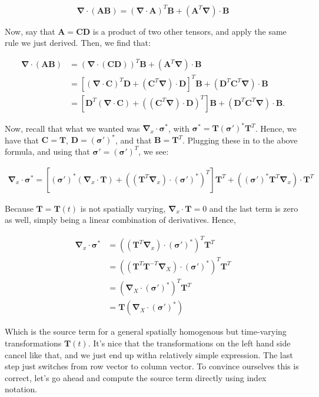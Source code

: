 \documentclass[11pt]{article}
\newcommand{\bsig}{\boldsymbol\sigma}
\newcommand{\bC}{\mathbf{C}}
\newcommand{\bD}{\mathbf{D}}
\newcommand{\bT}{\mathbf{T}}
\newcommand{\bgrad}{\boldsymbol{\nabla}}
\newcommand{\bA}{\mathbf{A}}
\newcommand{\bB}{\mathbf{B}}
\begin{document}
\begin{equation*}
    \bgrad\cdot(\bA \bB) = (\bgrad\cdot \bA)^T\bB + (\bA^T\bgrad)\cdot \bB
\end{equation*}

Now, say that $\bA = \bC \bD$ is a product of two other tensors, and apply the same rule we just derived. Then, we find that:

\begin{align*}
    \bgrad\cdot(\bA \bB) &= (\bgrad \cdot (\bC \bD))^T\bB + (\bA^T \bgrad)\cdot \bB\\
    &= [(\bgrad\cdot \bC)^T\bD + (\bC^T\bgrad)\cdot \bD]^T\bB + (\bD^T\bC^T\bgrad)\cdot\bB\\
    &= [\bD^T(\bgrad\cdot\bC) + ((\bC^T\bgrad)\cdot \bD)^T]\bB + (\bD^T\bC^T\bgrad)\cdot\bB.
\end{align*}

Now, recall that what we wanted was $\bgrad_x \cdot \bsig^*$, with $\bsig^* = \bT (\bsig')^* \bT^T$. Hence, we have that $\bC = \bT$, $\bD = (\bsig')^*$, and that $\bB = \bT^T$. Plugging these in to the above formula, and using that $\bsig' = (\bsig')^T$, we see:

\begin{align*}
    \bgrad_x\cdot\bsig^* = [( \bsig' )^*(\bgrad_x\cdot \bT) + ((\bT^T\bgrad_x)\cdot( \bsig' )^*)^T]\bT^T + (( \bsig' )^*\bT^T\bgrad_x)\cdot\bT^T
\end{align*}

Because $\bT = \bT(t)$ is not spatially varying, $\bgrad_x \cdot \bT = 0$ and the last term is zero as well, simply being a linear combination of derivatives. Hence,

\begin{align*}
    \bgrad_x\cdot\bsig^* &= ((\bT^T\bgrad_x)\cdot(\bsig')^*)^T\bT^T\\
    &= ((\bT^T\bT^{-T}\bgrad_X)\cdot(\bsig')^*)^T\bT^T\\
    &= (\bgrad_X\cdot(\bsig')^*)^T\bT^T\\
    &= \bT(\bgrad_X\cdot(\bsig')^*)
\end{align*}

Which is the source term for a general spatially homogenous but time-varying transformations $\bT(t)$. It's nice that the transformations on the left hand side cancel like that, and we just end up witha relatively simple expression. The last step just switches from row vector to column vector. To convince ourselves this is correct, let's go ahead and compute the source term directly using index notation.
\end{document}
